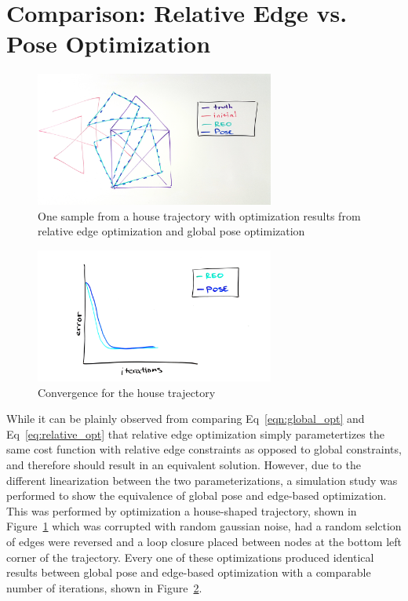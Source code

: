 
\section{Comparison: Relative Edge vs. Pose Optimization}

\begin{figure}
  \includegraphics[width=0.7\textwidth]{figures/house_trajectory.jpg}
  \caption{One sample from a house trajectory with optimization results from relative edge optimization and global pose optimization}
  \label{fig:house_trajectory}
\end{figure}

\begin{figure}
  \includegraphics[width=0.7\textwidth]{figures/convergence_comparison_house.jpg}
  \caption{Convergence for the house trajectory}
  \label{fig:convergence_house}
\end{figure}

While it can be plainly observed from comparing Eq~\ref{eqn:global_opt} and Eq~\ref{eq:relative_opt} that relative edge optimization simply parametertizes the same cost function with relative edge constraints as opposed to global constraints, and therefore should result in an equivalent solution.  However, due to the different linearization between the two parameterizations, a simulation study was performed to show the equivalence of global pose and edge-based optimization. This was performed by optimization a house-shaped trajectory, shown in Figure~\ref{fig:house_trajectory} which was corrupted with random gaussian noise, had a random selction of edges were reversed and a loop closure placed between nodes at the bottom left corner of the trajectory. Every one of these optimizations produced identical results between global pose and edge-based optimization with a comparable number of iterations, shown in Figure~\ref{fig:convergence_house}.

